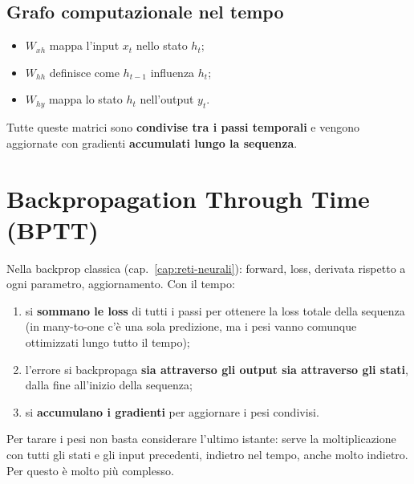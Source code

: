 \subsection{Grafo computazionale nel tempo}
\begin{itemize}
  \item $W_{xh}$ mappa l'input $x_t$ nello stato $h_t$;
  \item $W_{hh}$ definisce come $h_{t-1}$ influenza $h_t$;
  \item $W_{hy}$ mappa lo stato $h_t$ nell'output $y_t$.
\end{itemize}
Tutte queste matrici sono \textbf{condivise tra i passi temporali} e vengono aggiornate con gradienti \textbf{accumulati lungo la
sequenza}.

\section{Backpropagation Through Time (BPTT)}
Nella backprop classica (cap.~\ref{cap:reti-neurali}): forward, loss, derivata rispetto a ogni parametro, aggiornamento. Con il tempo:
\begin{enumerate}
  \item si \textbf{sommano le loss} di tutti i passi per ottenere la loss totale della sequenza (in many-to-one c'è una sola predizione,
        ma i pesi vanno comunque ottimizzati lungo tutto il tempo);
  \item l'errore si backpropaga \textbf{sia attraverso gli output sia attraverso gli stati}, dalla fine all'inizio della sequenza;
  \item si \textbf{accumulano i gradienti} per aggiornare i pesi condivisi.
\end{enumerate}
\begin{attenzione}
Per tarare i pesi non basta considerare l'ultimo istante: serve la moltiplicazione con tutti gli stati e gli input precedenti,
indietro nel tempo, anche molto indietro. Per questo è molto più complesso.
\end{attenzione}

